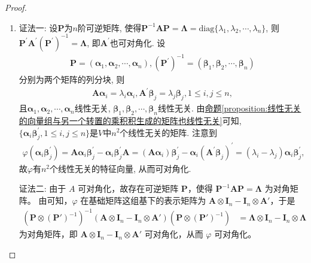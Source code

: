 \documentclass[../../main.tex]{subfiles}
\begin{document}
\begin{proof}
\begin{enumerate}
\item {\color{blue}证法一:}
设\(\boldsymbol{P}\)为\(n\)阶可逆矩阵, 使得\(\boldsymbol{P}^{-1}\boldsymbol{AP}=\boldsymbol{\Lambda}=\mathrm{diag}\{\lambda_{1},\lambda_{2},\cdots,\lambda_{n}\}\), 则\(\boldsymbol{P}^{\prime}\boldsymbol{A}^{\prime}(\boldsymbol{P}^{\prime})^{-1}=\boldsymbol{\Lambda}\), 即\(\boldsymbol{A}^{\prime}\)也可对角化. 设
\begin{align*}
\boldsymbol{P}=(\boldsymbol{\alpha}_{1},\boldsymbol{\alpha}_{2},\cdots,\boldsymbol{\alpha}_{n}), (\boldsymbol{P}^{\prime})^{-1}=(\boldsymbol{\beta}_{1},\boldsymbol{\beta}_{2},\cdots,\boldsymbol{\beta}_{n})
\end{align*}
分别为两个矩阵的列分块, 则
\begin{align*}
\boldsymbol{A}\boldsymbol{\alpha}_{i}=\lambda_{i}\boldsymbol{\alpha}_{i}, \boldsymbol{A}^{\prime}\boldsymbol{\beta}_{j}=\lambda_{j}\boldsymbol{\beta}_{j}, 1\leqslant  i,j\leqslant  n,
\end{align*}
且\(\boldsymbol{\alpha}_{1},\boldsymbol{\alpha}_{2},\cdots,\boldsymbol{\alpha}_{n}\)线性无关, \(\boldsymbol{\beta}_{1},\boldsymbol{\beta}_{2},\cdots,\boldsymbol{\beta}_{n}\)线性无关. 由\hyperref[proposition:线性无关的向量组与另一个转置的乘积积生成的矩阵也线性无关]{命题\ref{proposition:线性无关的向量组与另一个转置的乘积积生成的矩阵也线性无关}}可知, \(\{\boldsymbol{\alpha}_{i}\boldsymbol{\beta}_{j}^{\prime},1\leqslant  i,j\leqslant  n\}\)是\(V\)中\(n^{2}\)个线性无关的矩阵. 注意到
\begin{align*}
\varphi(\boldsymbol{\alpha}_{i}\boldsymbol{\beta}_{j}^{\prime})=\boldsymbol{A}\boldsymbol{\alpha}_{i}\boldsymbol{\beta}_{j}^{\prime}-\boldsymbol{\alpha}_{i}\boldsymbol{\beta}_{j}^{\prime}\boldsymbol{A}=(\boldsymbol{A}\boldsymbol{\alpha}_{i})\boldsymbol{\beta}_{j}^{\prime}-\boldsymbol{\alpha}_{i}(\boldsymbol{A}^{\prime}\boldsymbol{\beta}_{j})^{\prime}=(\lambda_{i}-\lambda_{j})\boldsymbol{\alpha}_{i}\boldsymbol{\beta}_{j}^{\prime},
\end{align*}
故\(\varphi\)有\(n^{2}\)个线性无关的特征向量, 从而可对角化.

{\color{blue}证法二:}
由于 $A$ 可对角化，故存在可逆矩阵 $\boldsymbol{P}$，使得 $\boldsymbol{P}^{-1}\boldsymbol{AP} = \boldsymbol{\Lambda}$ 为对角矩阵。
由可知，$\varphi$ 在基础矩阵这组基下的表示矩阵为 $\boldsymbol{A} \otimes \boldsymbol{I}_n - \boldsymbol{I}_n \otimes \boldsymbol{A}'$，于是
\begin{align*}
(\boldsymbol{P} \otimes (\boldsymbol{P}')^{-1})^{-1}(\boldsymbol{A} \otimes \boldsymbol{I}_n - \boldsymbol{I}_n \otimes \boldsymbol{A}')(\boldsymbol{P} \otimes (\boldsymbol{P}')^{-1}) 
&= \boldsymbol{\Lambda} \otimes \boldsymbol{I}_n - \boldsymbol{I}_n \otimes \boldsymbol{\Lambda}
\end{align*}
为对角矩阵，即 $\boldsymbol{A} \otimes \boldsymbol{I}_n - \boldsymbol{I}_n \otimes \boldsymbol{A}'$ 可对角化，从而 $\varphi$ 可对角化。


\end{enumerate}
\end{proof}
\end{document}
